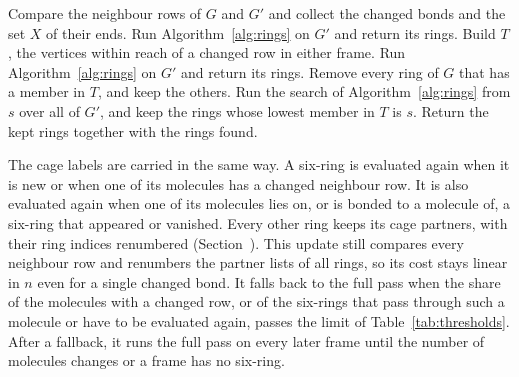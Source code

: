 \documentclass[preprint,12pt]{elsarticle}
\begin{document}
\begin{algorithm}[tbp]
\caption{Update of the primitive rings of up to seven members from $G$ to $G'$.}
\label{alg:update}
\begin{algorithmic}[1]
\State Compare the neighbour rows of $G$ and $G'$ and collect the changed bonds and the set $X$ of their ends.
\State Run Algorithm~\ref{alg:rings} on $G'$ and return its rings.
\EndIf
\State Build $T$, the vertices within reach of a changed row in either frame.
\State Run Algorithm~\ref{alg:rings} on $G'$ and return its rings.
\EndIf
\State Remove every ring of $G$ that has a member in $T$, and keep the others.
\State Run the search of Algorithm~\ref{alg:rings} from $s$ over all of $G'$, and keep the rings whose lowest member in $T$ is $s$.
\EndFor
\State Return the kept rings together with the rings found.
\end{algorithmic}
\end{algorithm}

The cage labels are carried in the same way.
A six-ring is evaluated again when it is new or when one of its molecules has a changed neighbour row.
It is also evaluated again when one of its molecules lies on, or is bonded to a molecule of, a six-ring that appeared or vanished.
Every other ring keeps its cage partners, with their ring indices renumbered (Section~).
This update still compares every neighbour row and renumbers the partner lists of all rings, so its cost stays linear in $n$ even for a single changed bond.
It falls back to the full pass when the share of the molecules with a changed row, or of the six-rings that pass through such a molecule or have to be evaluated again, passes the limit of Table~\ref{tab:thresholds}.
After a fallback, it runs the full pass on every later frame until the number of molecules changes or a frame has no six-ring.
\end{document}
